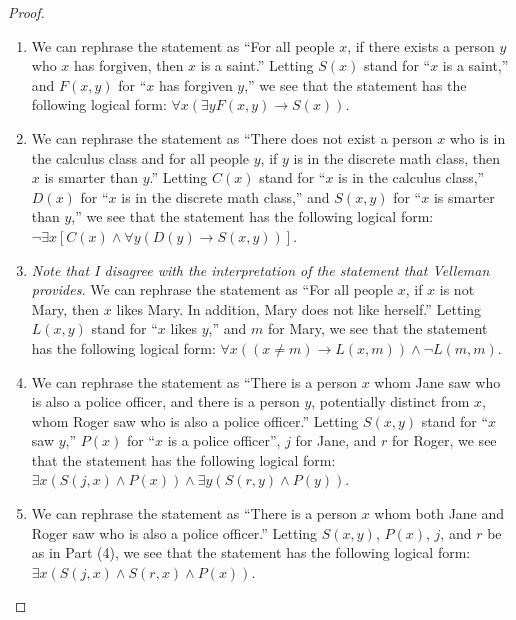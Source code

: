 \documentclass[12pt]{amsart}
\theoremstyle{definition}
\theoremstyle{remark}
\begin{document}
\begin{proof}
\hfill
\begin{enumerate}
	\item We can rephrase the statement as ``For all people $x$, if there exists a person $y$ who $x$ has forgiven, then $x$ is a saint.''
	Letting $S(x)$ stand for ``$x$ is a saint,'' and $F(x, y)$ for ``$x$ has forgiven $y$,'' we see that the statement has the following logical form:
	$\forall x (\exists y F(x, y) \rightarrow S(x))$.
	
	\item We can rephrase the statement as ``There does not exist a person $x$ who is in the calculus class and for all people $y$, if $y$ is in the discrete math class, then $x$ is smarter than $y$.''
	Letting $C(x)$ stand for ``$x$ is in the calculus class,'' $D(x)$ for ``$x$ is in the discrete math class,'' and $S(x, y)$ for ``$x$ is smarter than $y$,'' we see that the statement has the following logical form:
	$\neg \exists x [C(x) \wedge \forall y (D(y) \rightarrow S(x, y))]$.
	
	\item \emph{Note that I disagree with the interpretation of the statement that Velleman provides.}
	We can rephrase the statement as ``For all people $x$, if $x$ is not Mary, then $x$ likes Mary. In addition, Mary does not like herself.''
	Letting $L(x, y)$ stand for ``$x$ likes $y$,'' and $m$ for Mary, we see that the statement has the following logical form:
	$\forall x ((x \neq m) \rightarrow L(x, m)) \wedge \neg L(m, m)$.
	
	\item We can rephrase the statement as ``There is a person $x$ whom Jane saw who is also a police officer, and there is a person $y$, potentially distinct from $x$, whom Roger saw who is also a police officer.''
	Letting $S(x, y)$ stand for ``$x$ saw $y$,'' $P(x)$ for ``$x$ is a police officer'', $j$ for Jane, and $r$ for Roger, we see that the statement has the following logical form:
	$\exists x (S(j, x) \wedge P(x)) \wedge \exists y (S(r, y) \wedge P(y))$.
	
	\item We can rephrase the statement as ``There is a person $x$ whom both Jane and Roger saw who is also a police officer.''
	Letting $S(x, y)$, $P(x)$, $j$, and $r$ be as in Part (4), we see that the statement has the following logical form:
	$\exists x (S(j, x) \wedge S(r, x) \wedge P(x))$.
\end{enumerate}
\end{proof}
\end{document}
